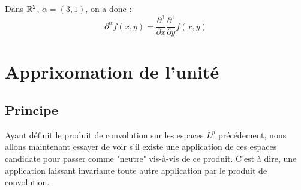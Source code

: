 \begin{example}
    Dans $\mathbb{R}^2$, $\alpha = (3,1)$, on a donc :
        \[ \partial^\alpha f(x,y) = \frac{\partial^3}{\partial x} \frac{\partial^1}{\partial y} f(x,y) \] 
\end{example}


\section{Apprixomation de l'unité}

\subsection{Principe }

Ayant définit le produit de convolution sur les espaces ${L}^p$ précédement, 
nous allons maintenant essayer de voir s'il existe une application de ces espaces candidate pour 
passer comme "neutre" vis-à-vis de ce produit. C'est à dire, une application laissant invariante 
toute autre application par le produit de convolution. 

